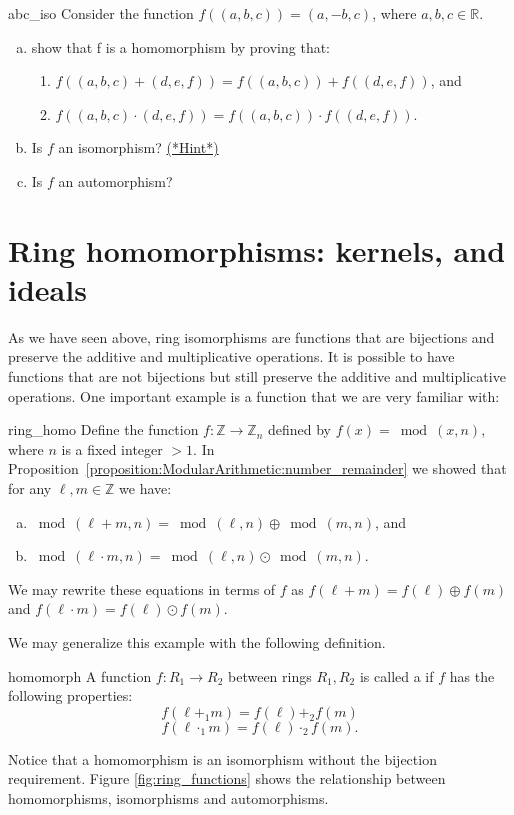 \begin{exercise}{abc_iso}
Consider the function $f((a,b,c))=(a,-b,c)$, where $a,b,c\in{\mathbb R}$.
\begin{enumerate}[(a)]
\item show that f is a homomorphism by proving that:
\begin{enumerate}[(1)]
\item $f((a,b,c)+(d,e,f))=f((a,b,c))+f((d,e,f))$, and 
\item $f((a,b,c)\cdot(d,e,f))=f((a,b,c))\cdot f((d,e,f))$.
\end{enumerate}
\item Is $f$ an isomorphism? \hyperref[ringsHints]{(*Hint*)} 
\item Is $f$ an automorphism?
\end{enumerate}
\end{exercise}

\section{Ring homomorphisms: kernels, and ideals}
\label{sec:Rings:RingHomomorphismKernelsIdeals}

As we have seen above, ring isomorphisms are functions that are bijections and preserve the additive and multiplicative operations. It is possible to have functions that are not bijections but still preserve the additive and multiplicative operations.  One important example is a function that we are very familiar with: 

\begin{example}{ring_homo}
Define the function $f:{\mathbb Z}\rightarrow {\mathbb Z}_n$ defined by $f(x)=\bmod(x,n)$, where $n$ is a fixed integer $> 1$.  In Proposition~\ref{proposition:ModularArithmetic:number_remainder} we showed that for any $\ell,m \in {\mathbb Z}$ we have:
\begin{enumerate}[(a)]
\item
$\bmod(\ell+ m,n) = \bmod(\ell,n) \oplus \bmod(m,n)$, 
and
\item
$\bmod(\ell \cdot m,n) = \bmod(\ell,n) \odot \bmod(m,n)$.
\end{enumerate}
We may rewrite these equations in terms of $f$ as $f(\ell+ m) = f(\ell) \oplus f(m)$ and $f(\ell\cdot m) = f(\ell) \odot f(m)$. 
\end{example}
We may generalize this example with the following definition.

\begin{defn}{homomorph}
A function $f:R_1\rightarrow R_2$ between rings $R_1,R_2$ is called a  if $f$ has the following properties:
\begin{equation}\label{eq:homo_add}
f(\ell+_1 m) = f(\ell) +_2 f(m)
\end{equation} 
\begin{equation}\label{eq:homo_mult}
f(\ell\cdot_1 m) = f(\ell) \cdot_2 f(m).
\end{equation}
\end{defn}
Notice that a homomorphism is an isomorphism without the bijection requirement.  Figure \ref{fig:ring_functions} shows the relationship between homomorphisms, isomorphisms and automorphisms.

